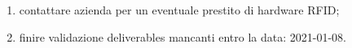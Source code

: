 \begin{enumerate}
    \item contattare azienda per un eventuale prestito di hardware RFID;
    \item finire validazione deliverables mancanti entro la data: 2021-01-08.
\end{enumerate}